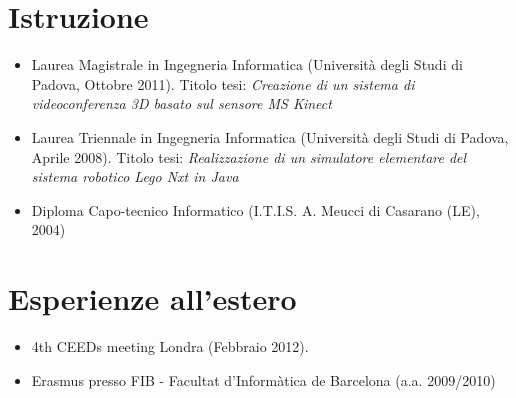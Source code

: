 \documentclass[pdftex,a4paper,10pt,twoside,titlepage,italian,openright]{article}
\begin{document}
\section*{Istruzione}
\begin{itemize}
	\item Laurea Magistrale in Ingegneria Informatica (Università degli Studi di Padova, Ottobre 2011).
	Titolo tesi: {\itshape Creazione di un sistema di videoconferenza 3D basato sul sensore MS Kinect}
	\item Laurea Triennale in Ingegneria Informatica (Università degli Studi di Padova, Aprile 2008). 
	Titolo tesi: {\itshape Realizzazione di un simulatore elementare del sistema robotico Lego Nxt
	in Java}
	\item Diploma Capo-tecnico Informatico (I.T.I.S. A. Meucci di Casarano (LE), 2004)
\end{itemize}
\section*{Esperienze all'estero}
\begin{itemize}
	\item 4th CEEDs meeting Londra (Febbraio 2012).
	\item Erasmus presso FIB - Facultat d’Informàtica de Barcelona (a.a. 2009/2010)
\end{itemize}
\end{document}
